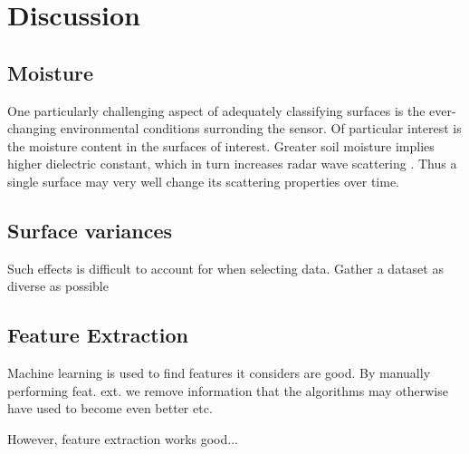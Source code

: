 \chapter{Discussion}


\section{Moisture}

One particularly challenging aspect of adequately classifying surfaces is the ever-changing environmental conditions surronding the sensor. Of particular interest is the moisture content in the surfaces of interest. Greater soil moisture implies higher dielectric constant, which in turn increases radar wave scattering \citep{rappaport_2006}. Thus a single surface may very well change its scattering properties over time. 


\section{Surface variances}

Such effects is difficult to account for when selecting data. Gather a dataset as diverse as possible

\section{Feature Extraction}
 Machine learning is used to find features it considers are good. By manually performing feat. ext. we remove information that the algorithms may otherwise have used to become even better etc. 

However, feature extraction works good...
